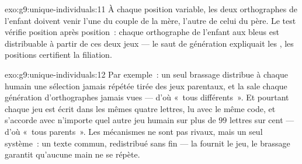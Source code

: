 \begin{solution}{exo:g9:unique-individuals:11}
À chaque position variable, les deux orthographes de
l'enfant doivent venir l'une du couple de la mère, l'autre
de celui du père. Le test vérifie position après position~:
chaque orthographe de l'enfant aux  bleus est
distribuable à partir de ces deux jeux --- le saut de
génération expliquait les , les positions certifient la
filiation.
\end{solution}

\begin{solution}{exo:g9:unique-individuals:12}
Par exemple~: un seul brassage distribue à chaque humain une
sélection jamais répétée tirée des jeux parentaux, et la
 sale chaque génération d'orthographes jamais vues
--- d'où «~tous différents~». Et pourtant chaque jeu est
écrit dans les mêmes quatre lettres, lu avec le même code,
et s'accorde avec n'importe quel autre jeu humain sur plus
de $99$ lettres sur cent --- d'où «~tous parents~». Les
mécanismes ne sont pas rivaux, mais un seul système~: un
texte commun, redistribué sans fin --- la  fournit le
jeu, le brassage garantit qu'aucune main ne se répète.
\end{solution}

